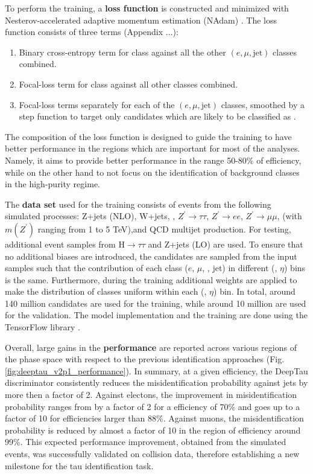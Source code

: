 To perform the training, a \textbf{loss function} is constructed and minimized with Nesterov-accelerated adaptive momentum estimation (NAdam) \cite{dozat2016incorporating}. The loss function consists of three terms (Appendix ...):
\begin{enumerate}
    \item Binary cross-entropy term for \tauh class against all the other $(e, \mu, \text{jet})$ classes combined.
    \item Focal-loss \cite{lin2017focal} term for \tauh class against all other classes combined.
    \item Focal-loss terms separately for each of the $(e, \mu, \text{jet})$ classes, smoothed by a step function to target only \tauh candidates which are likely to be classified as \tauh.
\end{enumerate}
The composition of the loss function is designed to guide the training to have better performance in the regions which are important for most of the analyses. Namely, it aims to provide better performance in the range 50-80\% of \tauh efficiency, while on the other hand to not focus on the identification of background classes in the high-purity regime.   

The \textbf{data set} used for the training consists of events from the following simulated processes: Z+jets (NLO), W+jets, \ttbar, $Z^{'} \to \tau \tau$, $Z^{'} \to ee$, $Z^{'} \to \mu \mu$, (with $m(Z^{'})$ ranging from 1 to 5 TeV),and QCD multijet production. For testing, additional event samples from $\text{H} \to \tau\tau$ and Z+jets (LO) are used. To ensure that no additional biases are introduced, the \tauh candidates are sampled from the input samples such that the contribution of each class ($e$, $\mu$, \tauh, jet) in different (\pt, $\eta$) bins is the same. Furthermore, during the training additional weights are applied to make the distribution of classes uniform within each (\pt, $\eta$) bin. In total, around 140 million \tauh candidates are used for the training, while around 10 million are used for the validation. The model implementation and the training are done using the TensorFlow library \cite{tensorflow2015-whitepaper}. 

Overall, large gains in the \textbf{performance} are reported across various regions of the phase space with respect to the previous \tauh identification approaches (Fig. \ref{fig:deeptau_v2p1_performance}). In summary, at a given \tauh efficiency, the DeepTau discriminator consistently reduces the misidentification probability against jets by more then a factor of 2. Against electons, the improvement in misidentification probability ranges from by a factor of 2 for a \tauh efficiency of 70\% and goes up to a factor of 10 for \tauh efficiencies larger than 88\%. Against muons, the misidentification probability is reduced by almost a factor of 10 in the region of \tauh efficiency around 99\%. This expected performance improvement, obtained from the simulated events, was successfully validated on collision data, therefore establishing a new milestone for the tau identification task. 

